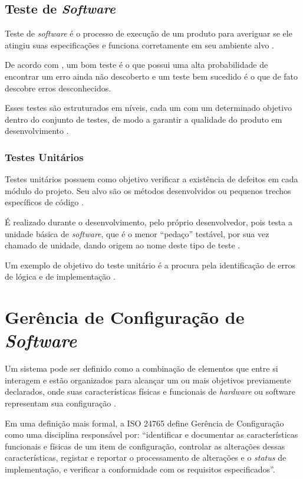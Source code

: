     \subsection{Teste de \textit{Software}}
    Teste de \textit{software} é o processo de execução de um produto para averiguar se ele atingiu suas especificações e funciona corretamente em seu ambiente alvo \cite{artigo_intro_teste}.

    De acordo com , um bom teste é o que possui uma alta probabilidade de encontrar um erro ainda não descoberto e um teste bem sucedido é o que de fato descobre erros desconhecidos.

    Esses testes são estruturados em níveis, cada um com um determinado objetivo dentro do conjunto de testes, de modo a garantir a qualidade do produto em desenvolvimento \cite{sw_test_tech}.

        \subsubsection{Testes Unitários}
        Testes unitários possuem como objetivo verificar a existência de defeitos em cada módulo do projeto. Seu alvo são os métodos desenvolvidos ou pequenos trechos específicos de código \cite{artigo_intro_teste}.

        É realizado durante o desenvolvimento, pelo próprio desenvolvedor, pois testa a unidade básica de \textit{software}, que é o menor ``pedaço''  testável, por sua vez chamado de unidade, dando origem ao nome deste tipo de teste \cite{sw_test_tech}.

        Um exemplo de objetivo do teste unitário é a procura pela identificação de erros de lógica e de implementação \cite{maldonado}.

\section{Gerência de Configuração de \textit{Software}}
Um sistema pode ser definido como a combinação de elementos que entre si interagem e estão organizados para alcançar um ou mais objetivos previamente declarados, onde suas características físicas e funcionais de \textit{hardware} ou software representam sua configuração \cite{SWEBOK2014}.

Em uma definição mais formal, a ISO 24765 \cite{iso_24765} define Gerência de Configuração como uma disciplina responsável por: ``identificar e documentar as características funcionais e físicas de um item de configuração, controlar as alterações dessas características, registar e reportar o processamento de alterações e o \textit{status} de implementação, e verificar a conformidade com os requisitos especificados''.

